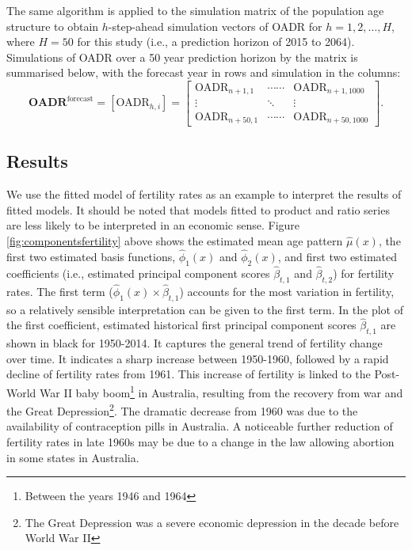 \documentclass[11pt,a4paper,]{article}
\begin{document}
The same algorithm is applied to the simulation matrix of the population age structure to obtain \(h\)-step-ahead simulation vectors of OADR for \(h=1,2,\dots,H\), where \(H=50\) for this study (i.e., a prediction horizon of 2015 to 2064). Simulations of OADR over a 50 year prediction horizon by the matrix is summarised below, with the forecast year in rows and simulation in the columns:
\begin{equation*}
  \bm{\text{OADR}}^{\text{forecast}}=\left[\text{OADR}_{h,i}\right] =
  \begin{bmatrix}
    \text{OADR}_{n+1,1} & \cdots\cdots & \text{OADR}_{n+1,1000} \\
    \vdots & \ddots & \vdots \\
    \text{OADR}_{n+50,1} & \cdots\cdots & \text{OADR}_{n+50,1000}
  \end{bmatrix}.
\end{equation*}

\hypertarget{results}{%
\subsection{Results}\label{results}}

We use the fitted model of fertility rates as an example to interpret the results of fitted models. It should be noted that models fitted to product and ratio series are less likely to be interpreted in an economic sense. Figure \ref{fig:componentsfertility} above shows the estimated mean age pattern \(\widehat{\mu}(x)\), the first two estimated basis functions, \(\widehat{\phi}_1(x)\) and \(\widehat{\phi}_2(x)\), and first two estimated coefficients (i.e., estimated principal component scores \(\widehat{\beta}_{t,1}\) and \(\widehat{\beta}_{t,2}\)) for fertility rates. The first term (\(\widehat{\phi}_1(x)\times \widehat{\beta}_{t,1}\)) accounts for the most variation in fertility, so a relatively sensible interpretation can be given to the first term. In the plot of the first coefficient, estimated historical first principal component scores \(\widehat{\beta}_{t,1}\) are shown in black for 1950-2014. It captures the general trend of fertility change over time. It indicates a sharp increase between 1950-1960, followed by a rapid decline of fertility rates from 1961. This increase of fertility is linked to the Post-World War II baby boom\footnote{Between the years 1946 and 1964} in Australia, resulting from the recovery from war and the Great Depression\footnote{The Great Depression was a severe economic depression in the decade before World War II}. The dramatic decrease from 1960 was due to the availability of contraception pills in Australia. A noticeable further reduction of fertility rates in late 1960s may be due to a change in the law allowing abortion in some states in Australia.
\end{document}
